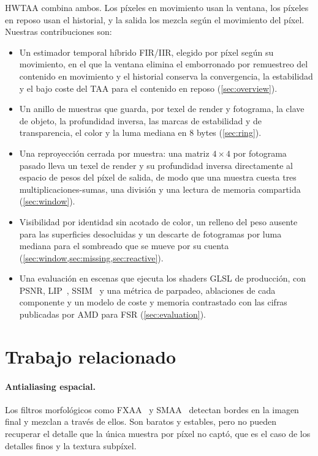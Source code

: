 \documentclass[11pt,a4paper]{article}
\newcommand{\FLIP}{\reflectbox{F}LIP}
\begin{document}
HWTAA combina ambos. Los píxeles en movimiento usan la ventana, los píxeles en reposo usan el historial, y la salida los mezcla según el movimiento del píxel. Nuestras contribuciones son:
\begin{itemize}
\item Un estimador temporal híbrido FIR/IIR, elegido por píxel según su movimiento, en el que la ventana elimina el emborronado por remuestreo del contenido en movimiento y el historial conserva la convergencia, la estabilidad y el bajo coste del TAA para el contenido en reposo (\cref{sec:overview}).
\item Un anillo de muestras que guarda, por texel de render y fotograma, la clave de objeto, la profundidad inversa, las marcas de estabilidad y de transparencia, el color y la luma mediana en 8 bytes (\cref{sec:ring}).
\item Una reproyección cerrada por muestra: una matriz $4\times4$ por fotograma pasado lleva un texel de render y su profundidad inversa directamente al espacio de pesos del píxel de salida, de modo que una muestra cuesta tres multiplicaciones-sumas, una división y una lectura de memoria compartida (\cref{sec:window}).
\item Visibilidad por identidad sin acotado de color, un relleno del peso ausente para las superficies desocluidas y un descarte de fotogramas por luma mediana para el sombreado que se mueve por su cuenta (\cref{sec:window,sec:missing,sec:reactive}).
\item Una evaluación en \nNumScenes{} escenas que ejecuta los shaders GLSL de producción, con PSNR, \FLIP{}~\cite{andersson2020flip}, SSIM~\cite{wang2004ssim} y una métrica de parpadeo, ablaciones de cada componente y un modelo de coste y memoria contrastado con las cifras publicadas por AMD para FSR (\cref{sec:evaluation}).
\end{itemize}

\section{Trabajo relacionado}

\paragraph{Antialiasing espacial.} Los filtros morfológicos como FXAA~\cite{lottes2009fxaa} y SMAA~\cite{jimenez2012smaa} detectan bordes en la imagen final y mezclan a través de ellos. Son baratos y estables, pero no pueden recuperar el detalle que la única muestra por píxel no captó, que es el caso de los detalles finos y la textura subpíxel.
\end{document}
